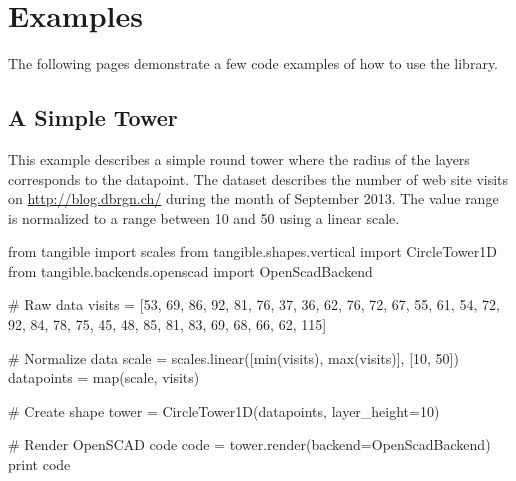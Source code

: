 
\chapter{Examples}

\label{ch:examples}

The following pages demonstrate a few code examples of how to use the
\tangible{} library.


\newpage
\section{A Simple Tower}\label{sec:tower}

This example describes a simple round tower where the radius of the layers
corresponds to the datapoint. The dataset describes the number of web site
visits on \url{http://blog.dbrgn.ch/} during the month of September 2013. The
value range is normalized to a range between 10 and 50 using a linear scale.

\vspace{.5\baselineskip}
\begin{pythoncode}
from tangible import scales
from tangible.shapes.vertical import CircleTower1D
from tangible.backends.openscad import OpenScadBackend

# Raw data
visits = [53, 69, 86, 92, 81, 76, 37, 36, 62, 76, 72, 67,
          55, 61, 54, 72, 92, 84, 78, 75, 45, 48, 85, 81,
          83, 69, 68, 66, 62, 115]

# Normalize data
scale = scales.linear([min(visits), max(visits)], [10, 50])
datapoints = map(scale, visits)

# Create shape
tower = CircleTower1D(datapoints, layer_height=10)

# Render OpenSCAD code
code = tower.render(backend=OpenScadBackend)
print code
\end{pythoncode}
\vspace{.5\baselineskip}

